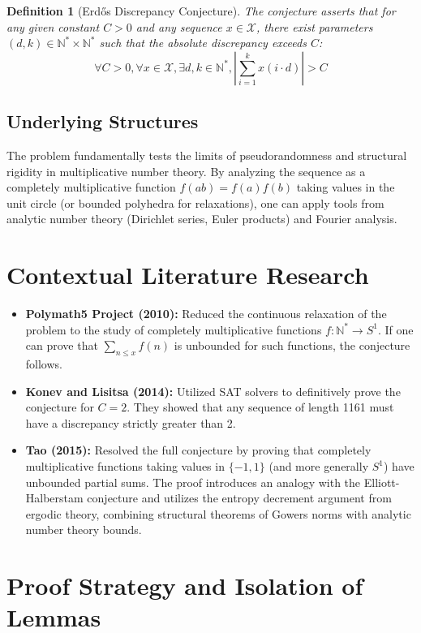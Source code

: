 \documentclass[11pt,a4paper]{article}
\newtheorem{definition}[theorem]{Definition}
\begin{document}
\begin{definition}[Erd\H{o}s Discrepancy Conjecture]
The conjecture asserts that for any given constant $C > 0$ and any sequence $x \in \mathcal{X}$, there exist parameters $(d, k) \in \mathbb{N}^* \times \mathbb{N}^*$ such that the absolute discrepancy exceeds $C$:
$$ \forall C > 0, \forall x \in \mathcal{X}, \exists d, k \in \mathbb{N}^*, \left| \sum_{i=1}^{k} x(i \cdot d) \right| > C $$
\end{definition}

\subsection{Underlying Structures}
The problem fundamentally tests the limits of pseudorandomness and structural rigidity in multiplicative number theory. By analyzing the sequence as a completely multiplicative function $f(ab) = f(a)f(b)$ taking values in the unit circle (or bounded polyhedra for relaxations), one can apply tools from analytic number theory (Dirichlet series, Euler products) and Fourier analysis.

\section{Contextual Literature Research}

\begin{itemize}
    \item \textbf{Polymath5 Project (2010):} Reduced the continuous relaxation of the problem to the study of completely multiplicative functions $f : \mathbb{N}^* \to S^1$. If one can prove that $\sum_{n \le x} f(n)$ is unbounded for such functions, the conjecture follows.
    \item \textbf{Konev and Lisitsa (2014):} Utilized SAT solvers to definitively prove the conjecture for $C=2$. They showed that any sequence of length 1161 must have a discrepancy strictly greater than 2.
    \item \textbf{Tao (2015):} Resolved the full conjecture by proving that completely multiplicative functions taking values in $\{-1, 1\}$ (and more generally $S^1$) have unbounded partial sums. The proof introduces an analogy with the Elliott-Halberstam conjecture and utilizes the entropy decrement argument from ergodic theory, combining structural theorems of Gowers norms with analytic number theory bounds.
\end{itemize}

\section{Proof Strategy and Isolation of Lemmas}
\end{document}
